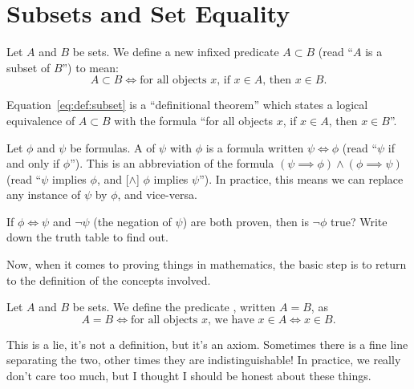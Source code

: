 \section{Subsets and Set Equality}

\begin{definition}
Let $A$ and $B$ be sets. We define a new infixed predicate $A\subset B$
(read ``$A$ is a subset of $B$'') to mean:
\begin{equation}\label{eq:def:subset}
A\subset B\iff\mbox{for all objects $x$, if $x\in A$, then $x\in B$.}
\end{equation}
\end{definition}

Equation~\ref{eq:def:subset} is a ``definitional theorem'' which states
a logical equivalence of $A\subset B$ with the formula ``for all objects
$x$, if $x\in A$, then $x\in B$''.

\begin{definition}
Let $\phi$ and $\psi$ be formulas. A  of
$\psi$ with $\phi$ is a formula written $\psi\iff\phi$ (read ``$\psi$ if
and only if $\phi$''). This is an abbreviation of the formula
$(\psi\implies\phi)\land(\phi\implies\psi)$ (read ``$\psi$ implies
$\phi$, and [$\land$] $\phi$ implies $\psi$''). In practice, this means
we can replace any instance of $\psi$ by $\phi$, and vice-versa.
\end{definition}

\begin{xca}
If $\phi\iff\psi$ and $\neg\psi$ (the negation of $\psi$) are both
proven, then is $\neg\phi$ true? Write down the truth table to find out.
\end{xca}

Now, when it comes to proving things in mathematics, the basic step is
to return to the definition of the concepts involved.

\begin{definition}
Let $A$ and $B$ be sets. We define the predicate ,
written $A=B$, as
\begin{equation}\label{eq:def:set-equality}
A=B\iff\mbox{for all objects $x$, we have $x\in A\iff x\in B$}.
\end{equation}
\end{definition}

\begin{remark}
This is a lie, it's not a definition, but it's an axiom. Sometimes there
is a fine line separating the two, other times they are
indistinguishable! In practice, we really don't care too much, but I
thought I should be honest about these things.
\end{remark}

